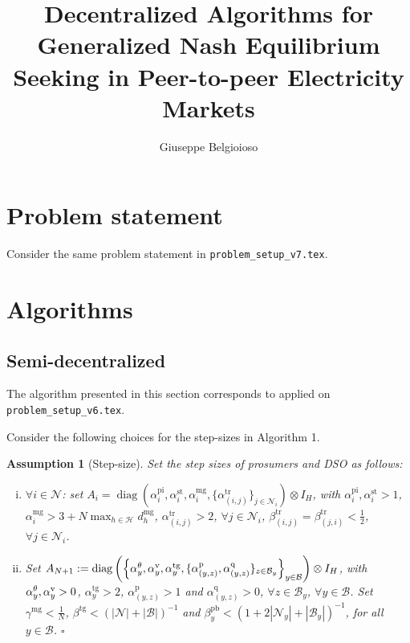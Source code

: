 \documentclass[10pt]{article}
\title{Decentralized Algorithms for Generalized Nash Equilibrium Seeking in Peer-to-peer Electricity Markets}
\author{Giuseppe Belgioioso}
\newtheorem{definitiox	n}{Definition}{\it}{}
\newtheorem{assumption}{Assumption}{\it}{}
\newcommand{\mc}{\mathcal}
\newcommand{\diag}{\operatorname{diag}}
\newcommand{\0}{\mathbf{0}}
\newcommand{\1}{\mathbf{1}}
\begin{document}
\maketitle

\section{Problem statement}
Consider the same problem statement in \texttt{problem\_setup\_v7.tex}.


\section{Algorithms}
\subsection{Semi-decentralized}

The algorithm presented in this section corresponds to \cite[Alg. 6B]{belgioioso2020semi} applied on  \texttt{problem\_setup\_v6.tex}.

Consider the following choices for the step-sizes in Algorithm 1.
\smallskip

\begin{assumption}[Step-size]\label{ass:SSS}
Set the step sizes of prosumers and DSO as follows:
\begin{enumerate}[(i)]
\item $\forall i \in \mc N$: set $A_i = \diag( \alpha_{i}^{\text{pi}}, \alpha_{i}^{\text{st}} , \alpha_{i}^{\text{mg}} , \{ \alpha_{(i,j)}^{\text{tr}} \}_{j \in \mc N_i} ) \otimes I_H$, with $\alpha_{i}^{\text{pi}}, \alpha_{i}^{\text{st}} > 1$, $ \alpha_{i}^{\text{mg}} > 3 + N \max_{h\in \mc H} d_h^{\text{mg}} $, $\alpha_{(i,j)}^{\text{tr}} > 2$, $\forall j \in \mc N_i$, $\beta^{\text{tr}}_{(i,j)} = \beta^{\text{tr}}_{ (j,i)} < \frac{1}{2}$, $\forall j \in \mc N_i$. 

\item Set $A_{N+1}:=\diag\left(
\left\{
\alpha_y^{\theta},\alpha^{\text v}_y, \alpha_y^{\text{tg}},
\{ 
\alpha^\text{p}_{(y,z)}, \alpha^{\text{q}}_{(y,z)} 
\}_{z \in \mc B_y}
\right\}_{y \in \mc B}
\right) \otimes I_H
$, with $\alpha_y^{\theta},\alpha^{\text v}_y > 0$, $\alpha_y^{\text{tg}} > 2$, $\alpha^{\text{p}}_{(y,z)} > 1$ and $ \alpha^{\text{q}}_{(y,z)} > 0 $, $\forall z \in \mc B_y$, $ \forall y \in \mc B$.
Set $\gamma^{\text{mg}} < \frac{1}{N}$, $\beta^{\text{tg}} < (|\mc N| + |\mc B|)^{-1}$ and $\beta_y^{\text{pb}} < (1+2|\mc N_y|+|\mc B_y|)^{-1}$, for all $y \in \mc B$.
{\hfill $\square$}
\end{enumerate}


\end{assumption}
\end{document}
